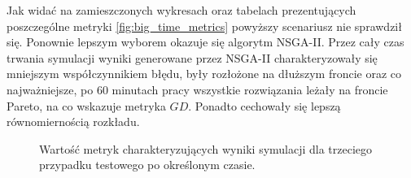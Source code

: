 \documentclass[twoside]{iisthesis}
\begin{document}
Jak widać na zamieszczonych wykresach oraz tabelach prezentujących poszczególne metryki \eqref{fig:big_time_metrics} powyższy scenariusz nie sprawdził się. Ponownie lepszym wyborem okazuje się algorytm NSGA-II. Przez cały czas trwania symulacji wyniki generowane przez NSGA-II charakteryzowały się mniejszym współczynnikiem błędu, były rozłożone na dłuższym froncie oraz co najważniejsze, po 60 minutach pracy wszystkie rozwiązania leżały na froncie Pareto, na co wskazuje metryka $GD$. Ponadto cechowały się lepszą równomiernością rozkładu.
\begin{figure}\centering
{}
    \hfill
{}

    \hfill
{}
\caption{Wartość metryk charakteryzujących wyniki symulacji dla trzeciego przypadku testowego po określonym czasie.}
    \label{fig:big_time_metrics}
\end{figure}
\end{document}
